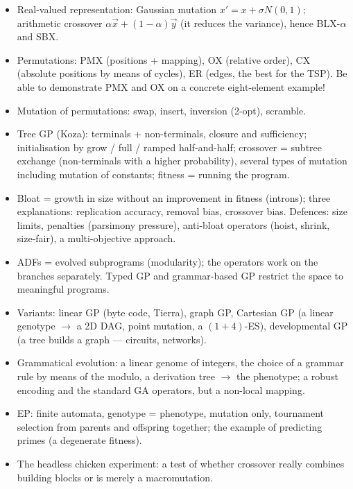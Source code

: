 \documentclass[11pt,a4paper]{article}
\theoremstyle{definition}
\begin{document}
\begin{itemize}
  only unbiased mutations, for ordinal ones biased (creep) mutations as well.
\item Real-valued representation: Gaussian mutation $x' = x + \sigma N(0,1)$;
  arithmetic crossover $\alpha \vec x + (1-\alpha)\vec y$ (it reduces the
  variance), hence BLX-$\alpha$ and SBX.
\item Permutations: PMX (positions + mapping), OX (relative order),
  CX (absolute positions by means of cycles), ER (edges, the best for the TSP).
  Be able to demonstrate PMX and OX on a concrete eight-element example!
\item Mutation of permutations: swap, insert, inversion (2-opt), scramble.
\item Tree GP (Koza): terminals + non-terminals, closure and sufficiency;
  initialisation by grow / full / ramped half-and-half; crossover = subtree
  exchange (non-terminals with a higher probability), several types of mutation
  including mutation of constants; fitness = running the program.
\item Bloat = growth in size without an improvement in fitness (introns); three
  explanations: replication accuracy, removal bias, crossover bias. Defences:
  size limits, penalties (parsimony pressure), anti-bloat operators (hoist,
  shrink, size-fair), a multi-objective approach.
\item ADFs = evolved subprograms (modularity); the operators work on the
  branches separately. Typed GP and grammar-based GP restrict the space to
  meaningful programs.
\item Variants: linear GP (byte code, Tierra), graph GP,
  Cartesian GP (a linear genotype $\to$ a 2D DAG, point mutation, a
  $(1+4)$-ES), developmental GP (a tree builds a graph --- circuits, networks).
\item Grammatical evolution: a linear genome of integers, the choice of a
  grammar rule by means of the modulo, a derivation tree $\to$ the phenotype; a
  robust encoding and the standard GA operators, but a non-local mapping.
\item EP: finite automata, genotype = phenotype, mutation only, tournament
  selection from parents and offspring together; the example of predicting
  primes (a degenerate fitness).
\item The headless chicken experiment: a test of whether crossover really
  combines building blocks or is merely a macromutation.
\end{itemize}

\end{document}

